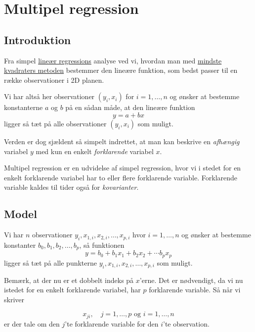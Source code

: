 
\section{Multipel regression}

\subsection{Introduktion}
Fra simpel \href{http://www.webmatematik.dk/lektioner/matematik-b/regression}{lineær regressions} analyse ved vi, hvordan man med \href{http://www.webmatematik.dk/lektioner/matematik-b/regression}{mindste kvadraters metoden} bestemmer den lineære funktion, som bedst passer til en række observationer i 2D planen.

Vi har altså her observationer \((y_i, x_i)\) for \(i=1,\ldots,n\) og ønsker at bestemme konstanterne \(a\) og \(b\) på en sådan måde, at den lineære funktion
\begin{displaymath}
  y = a + b x
\end{displaymath}
ligger så tæt på alle observationer \((y_i, x_i)\) som muligt.

Verden er dog sjældent så simpelt indrettet, at man kan beskrive en \textit{afhængig} variabel \(y\) med kun en enkelt \textit{forklarende} variabel \(x\).

Multipel regression er en udvidelse af simpel regression, hvor vi i stedet for en enkelt for\-kla\-ren\-de variabel har to eller flere forklarende variable. For\-kla\-ren\-de variable kaldes til tider også for \textit{kovarianter}.

\subsection{Model}
Vi har \(n\) observationer \(y_i,x_{1,i},x_{2,i},\ldots,x_{p,i}\) hvor \(i=1,\ldots,n\) og ønsker at bestemme konstanter \(b_0,b_1,b_2,\ldots,b_p\), så funktionen
\begin{displaymath}
  y = b_0 + b_1 x_1 + b_2 x_2 + \cdots b_p x_p
\end{displaymath}
ligger så tæt på alle punkterne \(y_i,x_{1,i},x_{2,i},\ldots,x_{p,i}\) som muligt.

Bemærk, at der nu er et dobbelt indeks på \(x\)'erne. Det er nødvendigt, da vi nu istedet for en enkelt forklarende variabel, har \(p\) forklarende variable. Så når vi skriver

\begin{displaymath}
  x_{ji}, \quad j=1,\ldots,p \textrm{ og } i=1,\ldots,n
\end{displaymath}
er der tale om den \(j\)'te forklarende variable for den \(i\)'te observation.

